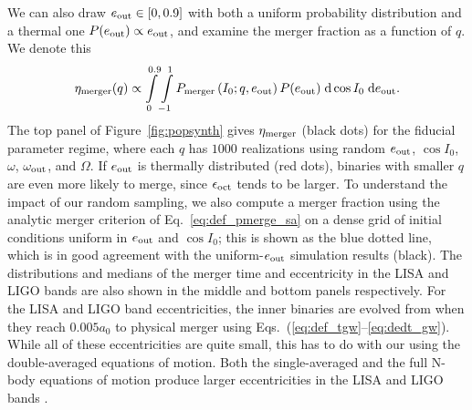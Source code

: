 \documentclass[
        fleqn,
        usenatbib,
    ]{mnras}
\newcommand*{\p}[1]{\left(#1\right)}
\begin{document}
We can also draw $e_{\rm out} \in [0, 0.9]$ with both a uniform probability
distribution and a thermal one $P(e_{\rm out}) \propto e_{\rm out}$, and examine
the merger fraction as a function of $q$. We denote this
\begin{equation}
    \eta_{\rm merger}(q) \propto
        \int\limits_{0}^{0.9}\int\limits_{-1}^1
            P_{\rm merger}\p{I_0; q, e_{\rm out}} P(e_{\rm out})
            \;\mathrm{d}\cos I_0\;\mathrm{d}e_{\rm out}.
\end{equation}
The top panel of Figure~\ref{fig:popsynth} gives $\eta_{\rm merger}$ (black
dots) for the fiducial parameter regime, where each $q$ has $1000$ realizations
using random $e_{\rm out}$, $\cos I_0$, $\omega$, $\omega_{\rm out}$, and
$\Omega$. If $e_{\rm out}$ is thermally distributed (red dots), binaries with
smaller $q$ are even more likely to merge, since $\epsilon_{\rm oct}$ tends to
be larger. To understand the impact of our random sampling, we also compute a
merger fraction using the analytic merger criterion of
Eq.~\eqref{eq:def_pmerge_sa} on a dense grid of initial conditions uniform in
$e_{\rm out}$ and $\cos I_0$; this is shown as the blue dotted line, which is in
good agreement with the uniform-$e_{\rm out}$ simulation results (black). The
distributions and medians of the merger time and eccentricity in the LISA and
LIGO bands are also shown in the middle and bottom panels respectively. For the
LISA and LIGO band eccentricities, the inner binaries are evolved from when they
reach $0.005 a_0$ to physical merger using
Eqs.~(\ref{eq:def_tgw}--\ref{eq:dedt_gw}). While all of these eccentricities are
quite small, this has to do with our using the double-averaged equations of
motion. Both the single-averaged and the full N-body equations of motion produce
larger eccentricities in the LISA and LIGO bands \citep{LL19}.
\end{document}
